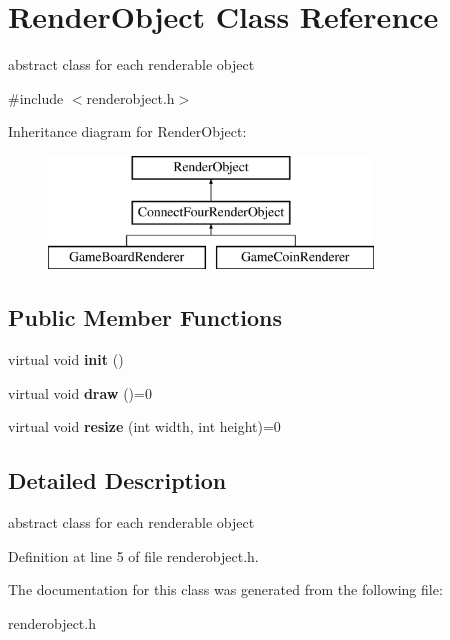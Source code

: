 \hypertarget{class_render_object}{\section{Render\-Object Class Reference}
\label{class_render_object}
}


abstract class for each renderable object  




{\ttfamily \#include $<$renderobject.\-h$>$}

Inheritance diagram for Render\-Object\-:\begin{figure}[H]
\begin{center}
\leavevmode
\includegraphics[height=3.000000cm]{class_render_object}
\end{center}
\end{figure}
\subsection*{Public Member Functions}
\begin{DoxyCompactItemize}
\item 
\hypertarget{class_render_object_ac4cc404d2bada4f6652b94cdaa833502}{virtual void {\bfseries init} ()}\label{class_render_object_ac4cc404d2bada4f6652b94cdaa833502}

\item 
\hypertarget{class_render_object_aa4578bf61a73304b8613727cd89ee576}{virtual void {\bfseries draw} ()=0}\label{class_render_object_aa4578bf61a73304b8613727cd89ee576}

\item 
\hypertarget{class_render_object_a46fffcc84648ad62836cab723c8c1f58}{virtual void {\bfseries resize} (int width, int height)=0}\label{class_render_object_a46fffcc84648ad62836cab723c8c1f58}

\end{DoxyCompactItemize}


\subsection{Detailed Description}
abstract class for each renderable object 

Definition at line 5 of file renderobject.\-h.



The documentation for this class was generated from the following file\-:\begin{DoxyCompactItemize}
\item 
renderobject.\-h\end{DoxyCompactItemize}
